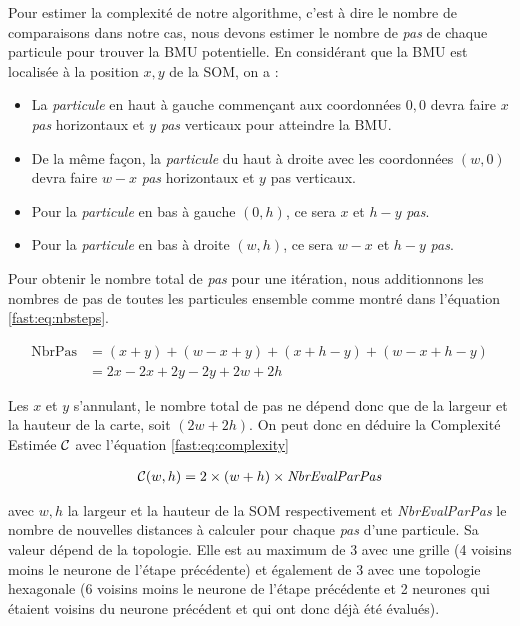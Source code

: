	Pour estimer la complexité de notre algorithme, c'est à dire le nombre de comparaisons dans notre cas, nous devons estimer le nombre de \textit{pas} de chaque particule pour trouver la BMU potentielle. En considérant que la BMU est localisée à la position $x, y$ de la SOM, on a :
	\begin{itemize}
    	\item La \textit{particule} en haut à gauche commençant aux coordonnées $0, 0$ devra faire $x$ \textit{pas} horizontaux et $y$ \textit{pas} verticaux pour atteindre la BMU.
		\item De la même façon, la \textit{particule} du haut à droite avec les coordonnées $(w,0)$ devra faire $w-x$ \textit{pas} horizontaux et $y$ pas verticaux.
		\item Pour la \textit{particule} en bas à gauche $(0,h)$, ce sera $x$ et $h-y$ \textit{pas}.
		\item Pour la \textit{particule} en bas à droite $(w,h)$, ce sera $w-x$ et $h-y$ \textit{pas}.
	\end{itemize}

	Pour obtenir le nombre total de \textit{pas} pour une itération, nous additionnons les nombres de pas de toutes les particules ensemble comme montré dans l'équation \ref{fast:eq:nbsteps}.

	\begin{equation}\label{fast:eq:nbsteps}
	\begin{split}
    	\text{NbrPas} &= (x + y) + (w - x + y) + (x + h - y) + (w - x + h - y)\\
		&= 2x - 2x + 2y - 2y + 2w + 2h 
	\end{split}
	\end{equation}

	Les $x$ et $y$ s'annulant, le nombre total de pas ne dépend donc que de la largeur et la hauteur de la carte, soit $(2w + 2h)$. On peut donc en déduire la Complexité Estimée $\cal C$ avec l'équation \ref{fast:eq:complexity}

	\begin{align}\label{fast:eq:complexity}
    	{\cal C}(w, h) = 2 \times (w + h) \times \textit{NbrEvalParPas}
	\end{align}

	avec $w, h$ la largeur et la hauteur de la SOM respectivement et \textit{NbrEvalParPas} le nombre de nouvelles distances à calculer pour chaque \textit{pas} d'une particule. Sa valeur dépend de la topologie. Elle est au maximum de 3 avec une grille (4 voisins moins le neurone de l'étape précédente) et également de 3 avec une topologie hexagonale (6 voisins moins le neurone de l'étape précédente et 2 neurones qui étaient voisins du neurone précédent et qui ont donc déjà été évalués). 

